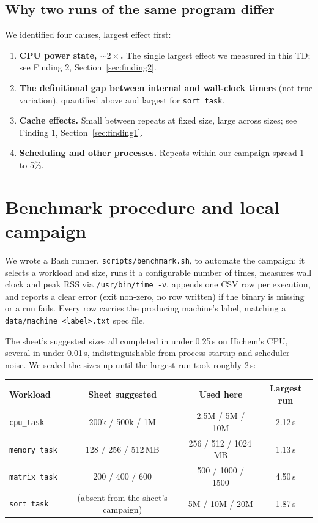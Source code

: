\documentclass[11pt]{article}
\newcommand{\code}[1]{\texttt{#1}}
\begin{document}
\subsection{Why two runs of the same program differ}
We identified four causes, largest effect first:
\begin{enumerate}
\item \textbf{CPU power state, $\sim\!2\times$.} The single largest effect we measured in this TD;
see Finding 2, Section~\ref{sec:finding2}.
\item \textbf{The definitional gap between internal and wall-clock timers} (not true variation),
quantified above and largest for \code{sort\_task}.
\item \textbf{Cache effects.} Small between repeats at fixed size, large across sizes; see Finding
1, Section~\ref{sec:finding1}.
\item \textbf{Scheduling and other processes.} Repeats within our campaign spread 1 to 5\%.
\end{enumerate}

\section{Benchmark procedure and local campaign}
\label{sec:campaign}
We wrote a Bash runner, \code{scripts/benchmark.sh}, to automate the campaign: it selects a
workload and size, runs it a configurable number of times, measures wall clock and peak RSS via
\code{/usr/bin/time -v}, appends one CSV row per execution, and reports a clear error (exit
non-zero, no row written) if the binary is missing or a run fails. Every row carries the producing
machine's label, matching a \code{data/machine\_<label>.txt} spec file.

The sheet's suggested sizes all completed in under 0.25\,s on Hichem's CPU, several in under
0.01\,s, indistinguishable from process startup and scheduler noise. We scaled the sizes up until
the largest run took roughly 2\,s:

\begin{center}
\begin{tabular}{lccc}
\toprule
Workload & Sheet suggested & Used here & Largest run \\
\midrule
\code{cpu\_task} & 200k / 500k / 1M & 2.5M / 5M / 10M & 2.12\,s \\
\code{memory\_task} & 128 / 256 / 512\,MB & 256 / 512 / 1024\,MB & 1.13\,s \\
\code{matrix\_task} & 200 / 400 / 600 & 500 / 1000 / 1500 & 4.50\,s \\
\code{sort\_task} & (absent from the sheet's campaign) & 5M / 10M / 20M & 1.87\,s \\
\bottomrule
\end{tabular}
\end{center}
\end{document}
